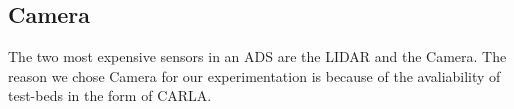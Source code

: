 %

\subsection{Camera}
The two most expensive sensors in an ADS are the LIDAR and the Camera. The reason we chose Camera for our experimentation is because of the avaliability of test-beds in the form of CARLA.